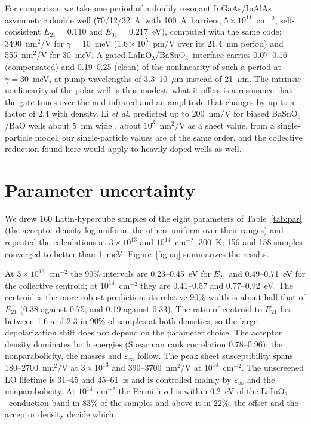 \documentclass[11pt]{article}
\newcommand{\LIO}{LaInO$_3$}
\newcommand{\BSO}{BaSnO$_3$}
\begin{document}
For comparison we take one period of a doubly resonant InGaAs/InAlAs asymmetric double well (70/12/32~\AA\ with 100~\AA\ barriers, $5\times10^{11}$~cm$^{-2}$, self-consistent $E_{21}=0.110$ and $E_{31}=0.217$~eV), computed with the same code: 3490~nm$^2$/V for $\gamma=10$~meV ($1.6\times10^5$~pm/V over its 21.4~nm period) and 555~nm$^2$/V for 30~meV. A gated \LIO/\BSO\ interface carries 0.07--0.16 (compensated) and 0.19--0.25 (clean) of the nonlinearity of such a period at $\gamma=30$~meV, at pump wavelengths of 3.3--10~$\mu$m instead of 21~$\mu$m. The intrinsic nonlinearity of the polar well is thus modest; what it offers is a resonance that the gate tunes over the mid-infrared and an amplitude that changes by up to a factor of 2.4 with density. Li \emph{et al.} predicted up to 200~nm/V for biased \BSO/BaO wells about 5~nm wide \cite{Li2021BSO}, about $10^{3}$~nm$^2$/V as a sheet value, from a single-particle model; our single-particle values are of the same order, and the collective reduction found here would apply to heavily doped wells as well.

\section{Parameter uncertainty}\label{sec:uq}
We drew 160 Latin-hypercube samples of the eight parameters of Table~\ref{tab:par} (the acceptor density log-uniform, the others uniform over their ranges) and repeated the calculations at $3\times10^{13}$ and $10^{14}$~cm$^{-2}$, 300~K; 156 and 158 samples converged to better than 1~meV. Figure~\ref{fig:uq} summarizes the results.

At $3\times10^{13}$~cm$^{-2}$ the 90\% intervals are 0.23--0.45~eV for $E_{21}$ and 0.49--0.71~eV for the collective centroid; at $10^{14}$~cm$^{-2}$ they are 0.41--0.57 and 0.77--0.92~eV. The centroid is the more robust prediction: its relative 90\% width is about half that of $E_{21}$ (0.38 against 0.75, and 0.19 against 0.33). The ratio of centroid to $E_{21}$ lies between 1.6 and 2.3 in 90\% of samples at both densities, so the large depolarization shift does not depend on the parameter choice. The acceptor density dominates both energies (Spearman rank correlation 0.78--0.96); the nonparabolicity, the masses and $\varepsilon_\infty$ follow. The peak sheet susceptibility spans 180--2700~nm$^2$/V at $3\times10^{13}$ and 390--3700~nm$^2$/V at $10^{14}$~cm$^{-2}$. The unscreened LO lifetime is 31--45 and 45--61~fs and is controlled mainly by $\varepsilon_\infty$ and the nonparabolicity. At $10^{14}$~cm$^{-2}$ the Fermi level is within 0.2~eV of the \LIO\ conduction band in 83\% of the samples and above it in 22\%; the offset and the acceptor density decide which.
\end{document}
